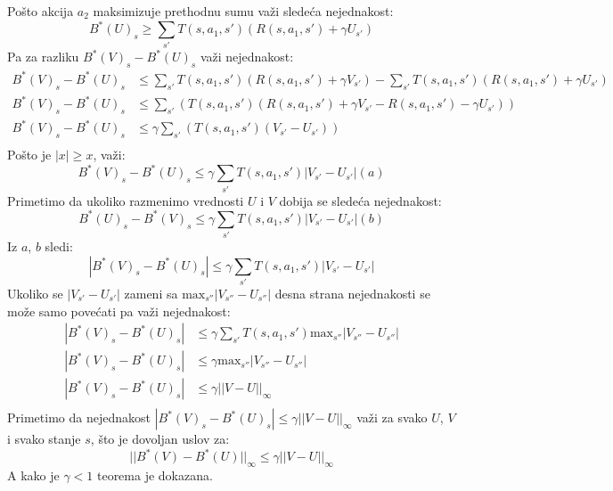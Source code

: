 \documentclass[a4paper,fleqn,12pt]{JMThesis}
\theoremstyle{plain}
\theoremstyle{definition}
\theoremstyle{definition}
\begin{document}
Pošto akcija $a_2$ maksimizuje prethodnu sumu važi sledeća nejednakost:
\[	B^*(U)_s \geq \sum_{s'}T(s,a_1,s')(R(s,a_1,s')+\gamma U_{s'}) \]
Pa za razliku $B^*(V)_s - B^*(U)_s$ važi nejednakost:
\[ 
	\begin{split}
		B^*(V)_s - B^*(U)_s &\leq \sum_{s'}T(s,a_1,s')(R(s,a_1,s')+\gamma V_{s'}) - \sum_{s'}T(s,a_1,s')(R(s,a_1,s')+\gamma U_{s'})\\
		B^*(V)_s - B^*(U)_s &\leq \sum_{s'}(T(s,a_1,s')(R(s,a_1,s') + \gamma V_{s'} - R(s,a_1,s') - \gamma U_{s'}))\\
		B^*(V)_s - B^*(U)_s &\leq \gamma \sum_{s'}(T(s,a_1,s')(V_{s'} - U_{s'}))\\
	\end{split}
\]
Pošto je $|x| \geq x$, važi:
\[ B^*(V)_s - B^*(U)_s \leq \gamma \sum_{s'}T(s,a_1,s')|V_{s'} - U_{s'}| (a)\]
Primetimo da ukoliko razmenimo vrednosti $U$ i $V$ dobija se sledeća nejednakost:
\[ B^*(U)_s - B^*(V)_s \leq \gamma \sum_{s'}T(s,a_1,s')|V_{s'} - U_{s'}| (b)\]
Iz $a$, $b$ sledi:
\[ |B^*(V)_s - B^*(U)_s| \leq \gamma \sum_{s'}T(s,a_1,s')|V_{s'} - U_{s'}| \] 
Ukoliko se $|V_{s'} - U_{s'}|$ zameni sa $\text{max}_{s''}|V_{s''} - U_{s''}|$ desna strana nejednakosti se može
samo povećati pa važi nejednakost:
\[ 
	\begin{split}
		|B^*(V)_s - B^*(U)_s| &\leq \gamma \sum_{s'}T(s,a_1,s')\text{max}_{s''}|V_{s''} - U_{s''}|\\
		|B^*(V)_s - B^*(U)_s| &\leq \gamma \text{max}_{s''}|V_{s''} - U_{s''}|\\
		|B^*(V)_s - B^*(U)_s| &\leq \gamma ||V - U||_{\infty}\\
	\end{split}
\] 
Primetimo da nejednakost $|B^*(V)_s - B^*(U)_s| \leq \gamma ||V - U||_{\infty}$ važi za svako $U$, $V$ 
i svako stanje $s$, što je dovoljan uslov za:
\[
	||B^*(V) - B^*(U)||_{\infty} \leq \gamma ||V - U||_{\infty}
\]
A kako je $\gamma < 1$ teorema je dokazana.
\end{document}

